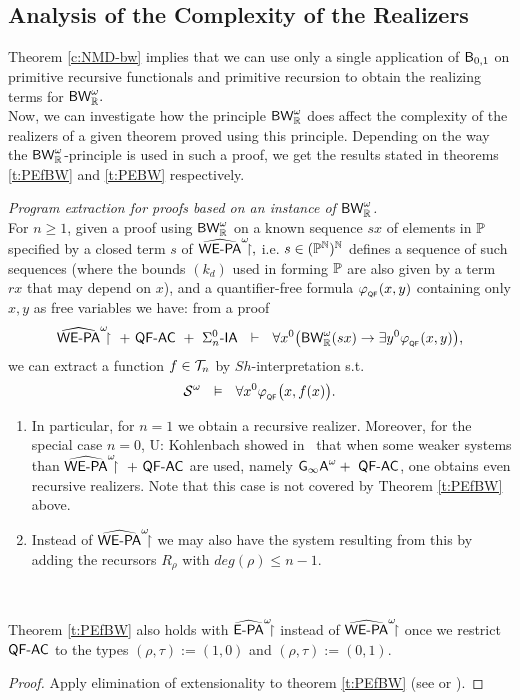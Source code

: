 \subsection {Analysis of the Complexity of the Realizers} \label{ss:acr}

\newcommand{\tn}{$t\in\T_n$}
\newcommand{\tsn}{$t\in\T_0$}

Theorem \ref{c:NMD-bw} implies that we can use only a single
application of $\textsf{\upshape B}_{0,1}$ on primitive recursive functionals
and primitive recursion to obtain the realizing terms for $\textsf{\upshape BW}^\omega_{\mathbb{R}}.$ \\
Now, we can investigate how the principle $\textsf{\upshape BW}^\omega_{\mathbb{R}}$ does affect the
complexity of the realizers of a given theorem proved using this principle.
Depending on the way the $\textsf{\upshape BW}^\omega_{\mathbb{R}}$-principle is used in such a proof, 
we get the results stated in theorems \ref{t:PEfBW} and \ref{t:PEBW} 
respectively.\\
%
\begin{thm}{\em Program extraction for proofs based on an instance of 
$\textsf{\upshape BW}^\omega_{\mathbb{R}}$.\\} 
\label{t:PEfBW}
For $n\geq1$, given a proof using $\textsf{\upshape BW}^\omega_{\mathbb{R}}$ on a known sequence $sx$ 
of elements in $\mathbb{P}$ 
specified by a closed term $s$ of $\widehat{\textsf{\upshape WE-PA}}^\omega\!\!\!\restriction,$ 
i.e. $s\in(\mathbb{P}^{\mathbb{N}})^{\mathbb{N}}$ defines a sequence of such sequences  
(where the bounds $(k_d)$ used in forming 
$\mathbb{P}$ are also given by a term $rx$ that may depend on $x$), and a 
quantifier-free formula $\varphi_{_{\textsf{\upshape QF}}}(x,y)$ containing only $x,y$ as 
free variables we have: from a proof 
\[
\hrrwepa\ +\ \QFm\AC\ +\ \Sigma^0_n\usftext{-IA}\ \ \vdash\ \ 
    \forall x^0\big(\BW^\omega_\RR(sx)\rightarrow\exists y^0 
\phi_{_\QF}(x,y)\big)\text{,}
\]
we can extract a function $f\in\mathcal{T}_n$ by $Sh$-interpretation s.t.
\[
\mathcal{S} ^\omega\ \ \vDash\ \ \forall x^0 \varphi_{_{\textsf{\upshape QF}}}\big(x,f(x)\big) \text{.}
\]
\end{thm}
\begin{remark}
\begin{enumerate}
\item
In particular, for $n=1$ we obtain a \lOrdm{\omega^{\omega^\omega}} 
recursive realizer.
Moreover, for the special case $n=0$, U: Kohlenbach showed 
in~\cite{Kohlenbach98} that when some weaker systems
than $\widehat{\textsf{\upshape WE-PA}}^\omega\!\!\!\restriction\ +\ \textsf{\upshape QF-}\textsf{\upshape AC}$ are used, namely 
$\usftext{G}_{\infty}\usftext{A}^\omega+\ \QFm\AC$,
one obtains even \lOrdm{\omega^\omega}recursive realizers. Note that this 
case is not covered by Theorem \ref{t:PEfBW} above.
\item 
Instead of $\widehat{\textsf{\upshape WE-PA}}^\omega\!\!\!\restriction$ we may also have the system resulting from this 
by adding the recursors $R_{\rho}$ with $deg(\rho)\le n-1.$
\end{enumerate} \mbox{ }
\end{remark}
\begin{cor} Theorem \ref{t:PEfBW} also holds with $\widehat{\textsf{\upshape E-PA}}^\omega\!\!\!\restriction$ instead of 
$\widehat{\textsf{\upshape WE-PA}}^\omega\!\!\!\restriction$ once we restrict $\textsf{\upshape QF-}\textsf{\upshape AC}$ to the types $(\rho,\tau):=(1,0)$ and 
$(\rho,\tau):=(0,1).$
\end{cor} 
\begin{proof} Apply elimination of extensionality to theorem \ref{t:PEfBW} 
(see \cite{Luckhardt73} or \cite{Kohlenbach08}). 
\end{proof}


